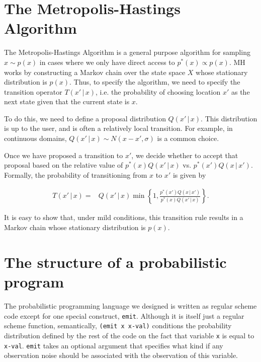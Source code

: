 \documentclass{article}
\begin{document}
\section{The Metropolis-Hastings Algorithm}

The Metropolis-Hastings Algorithm is a general purpose algorithm for sampling $x
\sim p(x)$ in cases where we only have direct access to $p^*(x) \propto
p(x)$. MH works by constructing a Markov chain over the state space $X$ whose
stationary distribution is $p(x)$. Thus, to specify the algorithm, we need to
specify the transition operator $T(x'\,|\,x)$, i.e. the probability of choosing
location $x'$ as the next state given that the current state is $x$. 

To do this, we need to define a proposal distribution $Q(x' \, | \, x)$. This
distribution is up to the user, and is often a relatively local transition. For
example, in continuous domains, $Q(x' \, | \, x) \sim N(x-x', \sigma)$ is a common
choice. 

Once we have proposed a transition to $x'$, we decide whether to accept that
proposal based on the relative value of $p^*(x) Q(x' \,| \, x)$ vs. $p^*(x') Q(x
\,| \, x')$. Formally, the probability of transitioning from $x$ to $x'$ is
given by  

\begin{align}
T(x'\, |\, x) =& Q(x' \, |\, x)\min \left \{1, 
                    \frac{p^*(x') Q(x \, |\, x')} 
                    {p^*(x) Q(x' \, |\, x)} \right \}.
                    \label{eq:MHTransitionProb}
\end{align}

It is easy to show that, under mild conditions, this transition rule results in
a Markov chain whose stationary distribution is $p(x)$.

\section{The structure of a probabilistic program}

The probabilistic programming language we designed is written as regular scheme
code except for one special construct, \verb+emit+.  Although it is itself just a
regular scheme function, semantically, \verb+(emit x x-val)+ conditions the
probability distribution defined by the rest of the code on the fact that
variable \verb+x+ is equal to \verb+x-val+. \verb+emit+ takes an optional
argument that specifies what kind if any observation noise should be associated
with the observation of this variable. 
\end{document}
